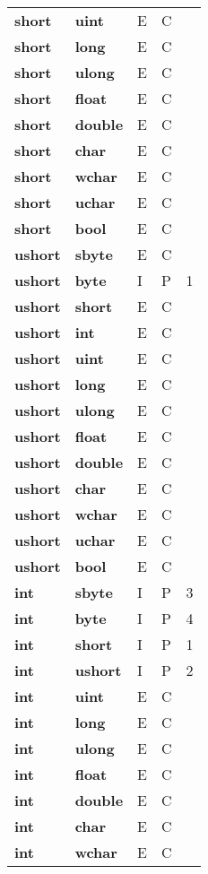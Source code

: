 \documentclass[a4paper,oneside,11pt]{book}
\theoremstyle{definition}
\begin{document}
\begin{flushleft}
\begin{supertabular}{lllll}
\textbf{short}& \textbf{uint}& E& C&\\
\textbf{short}& \textbf{long}& E& C&\\
\textbf{short}& \textbf{ulong}& E& C&\\
\textbf{short}& \textbf{float}& E& C&\\
\textbf{short}& \textbf{double}& E& C&\\
\textbf{short}& \textbf{char}& E& C&\\
\textbf{short}& \textbf{wchar}& E& C&\\
\textbf{short}& \textbf{uchar}& E& C&\\
\textbf{short}& \textbf{bool}& E& C&\\
\hline
\textbf{ushort}& \textbf{sbyte}& E& C&\\
\textbf{ushort}& \textbf{byte}& I& P&1\\
\textbf{ushort}& \textbf{short}& E& C&\\
\textbf{ushort}& \textbf{int}& E& C&\\
\textbf{ushort}& \textbf{uint}& E& C&\\
\textbf{ushort}& \textbf{long}& E& C&\\
\textbf{ushort}& \textbf{ulong}& E& C&\\
\textbf{ushort}& \textbf{float}& E& C&\\
\textbf{ushort}& \textbf{double}& E& C&\\
\textbf{ushort}& \textbf{char}& E& C&\\
\textbf{ushort}& \textbf{wchar}& E& C&\\
\textbf{ushort}& \textbf{uchar}& E& C&\\
\textbf{ushort}& \textbf{bool}& E& C&\\
\hline
\textbf{int}& \textbf{sbyte}& I& P&3\\
\textbf{int}& \textbf{byte}& I& P&4\\
\textbf{int}& \textbf{short}& I& P&1\\
\textbf{int}& \textbf{ushort}& I& P&2\\
\textbf{int}& \textbf{uint}& E& C&\\
\textbf{int}& \textbf{long}& E& C&\\
\textbf{int}& \textbf{ulong}& E& C&\\
\textbf{int}& \textbf{float}& E& C&\\
\textbf{int}& \textbf{double}& E& C&\\
\textbf{int}& \textbf{char}& E& C&\\
\textbf{int}& \textbf{wchar}& E& C&\\

\end{supertabular}
\end{flushleft}
\end{document}
